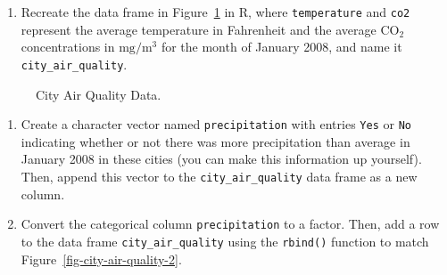 \documentclass[
  letterpaper,
]{krantz}
\providecommand{\tightlist}{%
  \setlength{\itemsep}{0pt}\setlength{\parskip}{0pt}}\usepackage{longtable,booktabs,array}
\begin{document}
\begin{enumerate}
\def\labelenumi{\arabic{enumi}.}
\tightlist
\item
  Recreate the data frame in Figure~\ref{fig-city-air-quality} in R,
  where \texttt{temperature} and \texttt{co2} represent the average
  temperature in Fahrenheit and the average \(\text{CO}_2\)
  concentrations in \(\text{mg}/\text{m}^3\) for the month of January
  2008, and name it \texttt{city\_air\_quality}.
\end{enumerate}

\begin{figure}


\caption{\label{fig-city-air-quality}City Air Quality Data.}

\end{figure}%

\begin{enumerate}
\def\labelenumi{\arabic{enumi}.}
\setcounter{enumi}{1}
\item
  Create a character vector named \texttt{precipitation} with entries
  \texttt{Yes} or \texttt{No} indicating whether or not there was more
  precipitation than average in January 2008 in these cities (you can
  make this information up yourself). Then, append this vector to the
  \texttt{city\_air\_quality} data frame as a new column.
\item
  Convert the categorical column \texttt{precipitation} to a factor.
  Then, add a row to the data frame \texttt{city\_air\_quality} using
  the \texttt{rbind()} function to match
  Figure~\ref{fig-city-air-quality-2}.
\end{enumerate}
\end{document}
